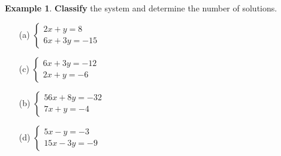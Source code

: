\documentclass{report}
\theoremstyle{definition}
\newtheorem{example}{\bf Example}
\begin{document}
\newpage



 \begin{example}
\textbf{Classify} the system and determine the number of solutions.
 \end{example}
%
\vspace{-0.5cm}
\hspace{-0.5cm}
%
\begin{minipage}{0.45\linewidth}
 \begin{itemize}
     \item[(a)]
        $\begin{cases}
            2x+y=8 \\
            6x+3y=-15
        \end{cases}$\\
 \end{itemize}
%
\vspace{2.55cm}
%
 \begin{itemize}
     \item[(c)]
        $\begin{cases}
            6x+3y=-12 \\
            2x+y=-6
        \end{cases}$\\
 \end{itemize}
%
\vspace{2.55cm}
%
\end{minipage}
\hspace{1.5cm}
\begin{minipage}{0.45\linewidth}
 \begin{itemize}
     \item[(b)]
        $\begin{cases}
            56x+8y=-32 \\
            7x+y=-4
        \end{cases}$\\
 \end{itemize}
%
\vspace{2.55cm}
%
 \begin{itemize}
     \item[(d)]
        $\begin{cases}
            5x-y=-3 \\
            15x-3y=-9
        \end{cases}$\\
 \end{itemize}
%
\vspace{2.55cm}
%
\end{minipage}
\end{document}
